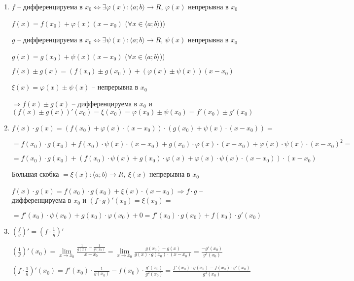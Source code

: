 \documentclass[14pt, letter paper]{article}
\newcommand{\q}[1]{\langle #1 \rangle}
\begin{document}
\begin{enumerate}
    \item $f$ -- дифференцируема в $x_0 \Leftrightarrow \exists \varphi(x) : \q{a; b} \rightarrow R$, $\varphi(x)$ непрерывна в $x_0$
    
    $f(x) = f(x_0) + \varphi(x)(x - x_0)$ ($\forall x \in \q{a; b}$))

    $g$ -- дифференцируема в $x_0 \Leftrightarrow \exists \psi(x) : \q{a; b} \rightarrow R$, $\psi(x)$ непрерывна в $x_0$

    $g(x) = g(x_0) + \psi(x)(x - x_0)$ ($\forall x \in \q{a; b}$))

    $f(x) \pm g(x) = (f(x_0) \pm g(x_0)) + (\varphi(x) \pm \psi(x))(x - x_0)$

    $\xi(x) = \varphi(x) \pm \psi(x)$ -- непрерывна в $x_0$

    $\Rightarrow f(x) \pm g(x)$ -- дифференцируема в $x_0$ и $(f(x) \pm g(x))'(x_0) = \xi(x_0) = \varphi(x_0) \pm \psi(x_0) = f'(x_0) \pm g'(x_0)$

    \item $f(x) \cdot g(x) = (f(x_0) + \varphi(x) \cdot (x - x_0)) \cdot (g(x_0) + \psi(x) \cdot (x - x_0)) =$
    
    $= f(x_0) \cdot g(x_0) + f(x_0) \cdot \psi(x) \cdot (x - x_0) + g(x_0) \cdot \varphi(x) \cdot (x - x_0) + \varphi(x) \cdot \psi(x) \cdot (x - x_0)^2 =$

    $= f(x_0) \cdot g(x_0) + (f(x_0) \cdot \psi(x) + g(x_0) \cdot \varphi(x) + \varphi(x) \cdot \psi(x) \cdot (x - x_0)) \cdot (x - x_0)$

    Большая скобка $= \xi(x) : \q{a; b} \rightarrow R,\ \xi(x)$ непрерывна в $x_0$

    $f(x) \cdot g(x) = f(x_0) \cdot g(x_0) + \xi(x) \cdot (x - x_0) \Rightarrow f \cdot g$ -- дифференцируема в $x_0$ и $(f \cdot g)'(x_0) = \xi(x_0) =$
    
    $= f'(x_0) \cdot \psi(x_0) + g(x_0) \cdot \varphi(x_0) + 0 = f'(x_0) \cdot g(x_0) + f(x_0) \cdot g'(x_0)$

    \item $(\frac{f}{g})' = (f \cdot \frac{1}{g})'$
    
    $(\frac{1}{g})'(x_0) = \lim\limits_{x \rightarrow x_0} \frac{\frac{1}{g(x)} - \frac{1}{g(x_0)}}{x - x_0} = \lim\limits_{x \rightarrow x_0} \frac{g(x_0) - g(x)}{g(x) \cdot g(x_0) \cdot (x - x_0)} = \frac{-g'(x_0)}{g^2(x_0)}$

    $(f \cdot \frac{1}{g})'(x_0) = f'(x_0) \cdot \frac{1}{g(x_0)} - f(x_0) \cdot \frac{g'(x_0)}{g^2(x_0)} = \frac{f'(x_0) \cdot g(x_0) - f(x_0) \cdot g'(x_0)}{g^2(x_0)}$
\end{enumerate}
\end{document}
